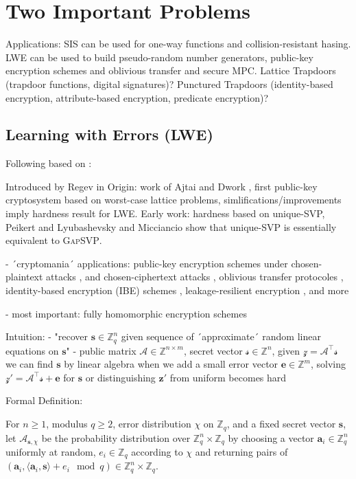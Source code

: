 \documentclass[
  a4paper,  %
  twoside,  %
  bibliography=totoc,
  headsepline,
  cleardoublepage=empty,
  parskip=half,
  draft=false
]{scrbook}
\begin{document}
\section{Two Important Problems}
Applications: SIS can be used for one-way functions and collision-resistant hasing. LWE can be used to build pseudo-random number generators, public-key encryption schemes and oblivious transfer and secure MPC. Lattice Trapdoors (trapdoor functions, digital signatures)? Punctured Trapdoors (identity-based encryption, attribute-based encryption, predicate encryption)? %

\subsection{Learning with Errors (LWE)} \label{sec:lwe}
Following based on \cite{Reg10}:%

Introduced by Regev in \cite{Reg09}
Origin: work of Ajtai and Dwork \cite{AD97}, first public-key cryptosystem based on worst-case lattice problems, simlifications/improvements \cite{GGH97b, Reg03} imply hardness result for LWE.
Early work: hardness based on unique-SVP, Peikert \cite{Pei09} and Lyubashevsky and Micciancio \cite{LM09} show that unique-SVP is essentially equivalent to \textsc{GapSVP}.

- ´cryptomania´ applications: public-key encryption schemes under chosen-plaintext attacks \cite{Reg05, KTX07, PVW08}, and chosen-ciphertext attacks \cite{PW08, Pei09}, oblivious transfer protocoles \cite{PVW08}, identity-based encryption (IBE) schemes \cite{GPV08, CHKP10, ABB10}, leakage-resilient encryption \cite{AGV09, ACPS09, DGKPV10, GKPV10}, and more %

- most important: fully homomorphic encryption schemes \cite{Gen09a, BV11, Bra12, GSW13} %

Intuition:
- "recover $\mathbf{s} \in \mathbb{Z}_q^n$ given sequence of ´approximate´ random linear equations on $\mathbf{s}$"
- public matrix  $\mathcal{A} \in \mathbb{Z}^{n \times m}$, secret vector $\mathcal{s}\in \mathbb{Z}^n$, given $\mathcal{z} = \mathcal{A}^\intercal \mathcal{s}$ we can find $\mathbf{s}$ by linear algebra
when we add a small error vector $\mathbf{e} \in \mathbb{Z}^m$, solving $\mathcal{z}' = \mathcal{A}^\intercal \mathcal{s} + \mathbf{e}$ for $\mathbf{s}$ or distinguishing $\mathbf{z}'$ from uniform becomes hard


Formal Definition:
\begin{definition} %
  For $n \geq 1$, modulus $q \geq 2$, error distribution $\chi$ on $\mathbb{Z}_q$, and a fixed secret vector $\mathbf{s}$, let $\mathcal{A}_{\mathbf{s}, \chi}$ be the probability distribution over $\mathbb{Z}_q^n \times \mathbb{Z}_q$ by choosing a vector $\mathbf{a}_i \in \mathbb{Z}_q^n$ uniformly at random, $e_i \in \mathbb{Z}_q$ according to $\chi$ and returning pairs of $(\mathbf{a}_i, \langle \mathbf{a}_i, \mathbf{s} \rangle + e_i \mod q) \in \mathbb{Z}_q^n \times \mathbb{Z}_q$.
\end{definition}
\end{document}
